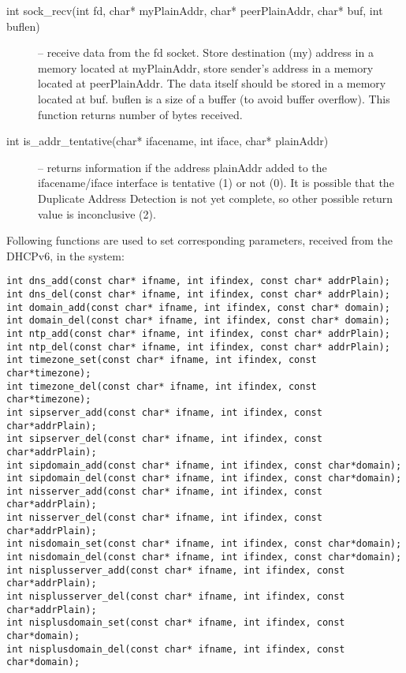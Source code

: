 \begin{description}
\item[int sock\_recv(int fd, char* myPlainAddr, char* peerPlainAddr, char*
buf, int buflen)] -- receive data from the fd socket. Store destination (my)
address in a memory located at myPlainAddr, store sender's address in a
memory located at peerPlainAddr. The data itself should be stored in a
memory located at buf. buflen is a size of a buffer (to avoid buffer
overflow). This function returns number of bytes received.

\item[int is\_addr\_tentative(char* ifacename, int iface, char* plainAddr)]
-- returns information if the address plainAddr added to the ifacename/iface
interface is tentative (1) or not (0). It is possible that the Duplicate
Address Detection is not yet complete, so other possible return value is
inconclusive (2).
\end{description}

Following functions are used to set corresponding parameters, received
from the DHCPv6, in the system:

\begin{verbatim}
int dns_add(const char* ifname, int ifindex, const char* addrPlain);
int dns_del(const char* ifname, int ifindex, const char* addrPlain);
int domain_add(const char* ifname, int ifindex, const char* domain);
int domain_del(const char* ifname, int ifindex, const char* domain);
int ntp_add(const char* ifname, int ifindex, const char* addrPlain);
int ntp_del(const char* ifname, int ifindex, const char* addrPlain);
int timezone_set(const char* ifname, int ifindex, const char*timezone);
int timezone_del(const char* ifname, int ifindex, const char*timezone);
int sipserver_add(const char* ifname, int ifindex, const char*addrPlain);
int sipserver_del(const char* ifname, int ifindex, const char*addrPlain);
int sipdomain_add(const char* ifname, int ifindex, const char*domain);
int sipdomain_del(const char* ifname, int ifindex, const char*domain);
int nisserver_add(const char* ifname, int ifindex, const char*addrPlain);
int nisserver_del(const char* ifname, int ifindex, const char*addrPlain);
int nisdomain_set(const char* ifname, int ifindex, const char*domain);
int nisdomain_del(const char* ifname, int ifindex, const char*domain);
int nisplusserver_add(const char* ifname, int ifindex, const char*addrPlain);
int nisplusserver_del(const char* ifname, int ifindex, const char*addrPlain);
int nisplusdomain_set(const char* ifname, int ifindex, const char*domain);
int nisplusdomain_del(const char* ifname, int ifindex, const char*domain);
\end{verbatim}

